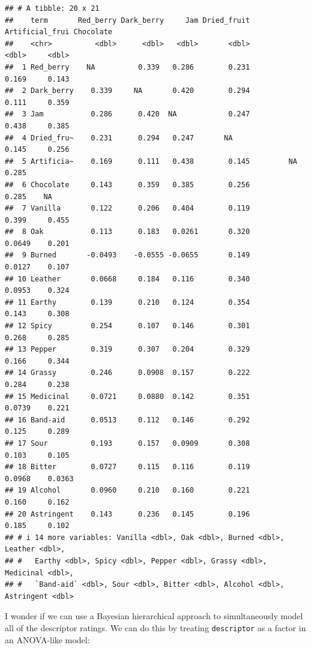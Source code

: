 \documentclass[
]{book}
\begin{document}
\begin{verbatim}
## # A tibble: 20 x 21
##    term       Red_berry Dark_berry     Jam Dried_fruit Artificial_frui Chocolate
##    <chr>          <dbl>      <dbl>   <dbl>       <dbl>           <dbl>     <dbl>
##  1 Red_berry    NA          0.339   0.286        0.231          0.169     0.143 
##  2 Dark_berry    0.339     NA       0.420        0.294          0.111     0.359 
##  3 Jam           0.286      0.420  NA            0.247          0.438     0.385 
##  4 Dried_fru~    0.231      0.294   0.247       NA              0.145     0.256 
##  5 Artificia~    0.169      0.111   0.438        0.145         NA         0.285 
##  6 Chocolate     0.143      0.359   0.385        0.256          0.285    NA     
##  7 Vanilla       0.122      0.206   0.404        0.119          0.399     0.455 
##  8 Oak           0.113      0.183   0.0261       0.320          0.0649    0.201 
##  9 Burned       -0.0493    -0.0555 -0.0655       0.149          0.0127    0.107 
## 10 Leather       0.0668     0.184   0.116        0.340          0.0953    0.324 
## 11 Earthy        0.139      0.210   0.124        0.354          0.143     0.308 
## 12 Spicy         0.254      0.107   0.146        0.301          0.268     0.285 
## 13 Pepper        0.319      0.307   0.204        0.329          0.166     0.344 
## 14 Grassy        0.246      0.0908  0.157        0.222          0.284     0.238 
## 15 Medicinal     0.0721     0.0880  0.142        0.351          0.0739    0.221 
## 16 Band-aid      0.0513     0.112   0.146        0.292          0.125     0.289 
## 17 Sour          0.193      0.157   0.0909       0.308          0.103     0.105 
## 18 Bitter        0.0727     0.115   0.116        0.119          0.0968    0.0363
## 19 Alcohol       0.0960     0.210   0.160        0.221          0.160     0.162 
## 20 Astringent    0.143      0.236   0.145        0.196          0.185     0.102 
## # i 14 more variables: Vanilla <dbl>, Oak <dbl>, Burned <dbl>, Leather <dbl>,
## #   Earthy <dbl>, Spicy <dbl>, Pepper <dbl>, Grassy <dbl>, Medicinal <dbl>,
## #   `Band-aid` <dbl>, Sour <dbl>, Bitter <dbl>, Alcohol <dbl>, Astringent <dbl>
\end{verbatim}

I wonder if we can use a Bayesian hierarchical approach to simultaneously model all of the descriptor ratings. We can do this by treating \texttt{descriptor} as a factor in an ANOVA-like model:
\end{document}
